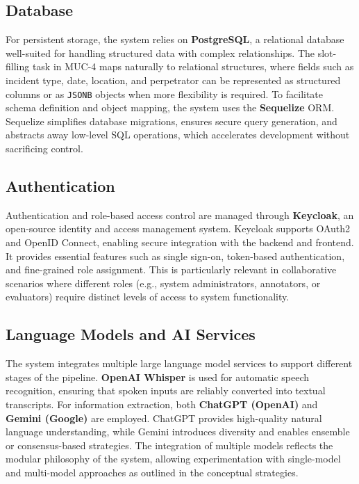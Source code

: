 \subsection*{Database}
For persistent storage, the system relies on \textbf{PostgreSQL}, a relational database well-suited for handling structured data with complex relationships. The slot-filling task in MUC-4 maps naturally to relational structures, where fields such as incident type, date, location, and perpetrator can be represented as structured columns or as \texttt{JSONB} objects when more flexibility is required. To facilitate schema definition and object mapping, the system uses the \textbf{Sequelize} ORM. Sequelize simplifies database migrations, ensures secure query generation, and abstracts away low-level SQL operations, which accelerates development without sacrificing control.

\subsection*{Authentication}
Authentication and role-based access control are managed through \textbf{Keycloak}, an open-source identity and access management system. Keycloak supports OAuth2 and OpenID Connect, enabling secure integration with the backend and frontend. It provides essential features such as single sign-on, token-based authentication, and fine-grained role assignment. This is particularly relevant in collaborative scenarios where different roles (e.g., system administrators, annotators, or evaluators) require distinct levels of access to system functionality.

\subsection*{Language Models and AI Services}
The system integrates multiple large language model services to support different stages of the pipeline. \textbf{OpenAI Whisper} is used for automatic speech recognition, ensuring that spoken inputs are reliably converted into textual transcripts. For information extraction, both \textbf{ChatGPT (OpenAI)} and \textbf{Gemini (Google)} are employed. ChatGPT provides high-quality natural language understanding, while Gemini introduces diversity and enables ensemble or consensus-based strategies. The integration of multiple models reflects the modular philosophy of the system, allowing experimentation with single-model and multi-model approaches as outlined in the conceptual strategies.


